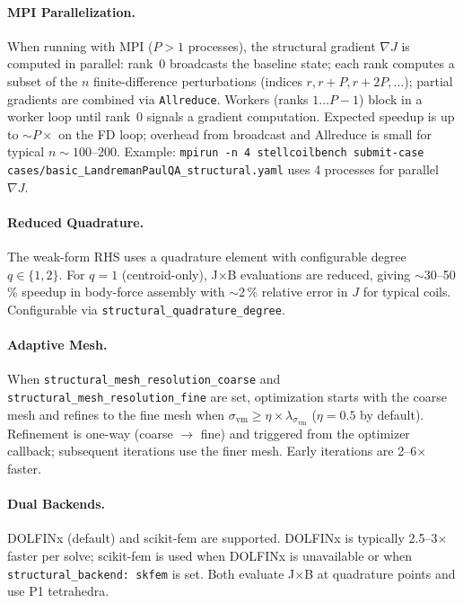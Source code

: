 \paragraph{MPI Parallelization.}
When running with MPI ($P > 1$ processes), the structural gradient $\nabla J$ is computed in parallel: rank~0 broadcasts the baseline state; each rank computes a subset of the $n$ finite-difference perturbations (indices $r, r+P, r+2P, \ldots$); partial gradients are combined via \texttt{Allreduce}. Workers (ranks $1 \ldots P{-}1$) block in a worker loop until rank~0 signals a gradient computation. Expected speedup is up to $\sim P\times$ on the FD loop; overhead from broadcast and Allreduce is small for typical $n \sim 100$--200. Example: \texttt{mpirun -n 4 stellcoilbench submit-case cases/basic\_LandremanPaulQA\_structural.yaml} uses 4 processes for parallel $\nabla J$.

\paragraph{Reduced Quadrature.}
The weak-form RHS uses a quadrature element with configurable degree $q \in \{1,2\}$. For $q=1$ (centroid-only), J$\times$B evaluations are reduced, giving $\sim$30--50\,\% speedup in body-force assembly with $\sim$2\,\% relative error in $J$ for typical coils. Configurable via \texttt{structural\_quadrature\_degree}.

\paragraph{Adaptive Mesh.}
When \texttt{structural\_mesh\_resolution\_coarse} and \texttt{structural\_mesh\_resolution\_fine} are set, optimization starts with the coarse mesh and refines to the fine mesh when $\sigma_{\text{vm}} \geq \eta \times \lambda_{\sigma_{\text{vm}}}$ ($\eta = 0.5$ by default). Refinement is one-way (coarse $\to$ fine) and triggered from the optimizer callback; subsequent iterations use the finer mesh. Early iterations are 2--6$\times$ faster.

\paragraph{Dual Backends.}
DOLFINx (default) and scikit-fem are supported. DOLFINx is typically 2.5--3$\times$ faster per solve; scikit-fem is used when DOLFINx is unavailable or when \texttt{structural\_backend: skfem} is set. Both evaluate J$\times$B at quadrature points and use P1 tetrahedra.

